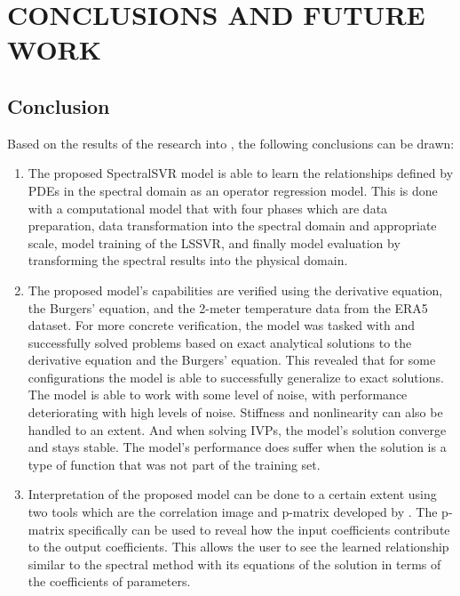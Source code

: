 \chapter{CONCLUSIONS AND FUTURE WORK}\label{sec:conclusions_and_future_work}

\section{Conclusion}
\noindent Based on the results of the research into \MakeLowercase{\judul}, the following conclusions can be drawn:
\begin{enumerate}
    \item The proposed SpectralSVR model is able to learn the relationships defined by PDEs in the spectral domain as an operator regression model. This is done with a computational model that with four phases which are data preparation, data transformation into the spectral domain and appropriate scale, model training of the LSSVR, and finally model evaluation by transforming the spectral results into the physical domain.
    \item The proposed model's capabilities are verified using the derivative equation, the Burgers' equation, and the 2-meter temperature data from the ERA5 dataset. For more concrete verification, the model was tasked with and successfully solved problems based on exact analytical solutions to the derivative equation and the Burgers' equation. This revealed that for some configurations the model is able to successfully generalize to exact solutions. The model is able to work with some level of noise, with performance deteriorating with high levels of noise. Stiffness and nonlinearity can also be handled to an extent. And when solving IVPs, the model's solution converge and stays stable. The model's performance does suffer when the solution is a type of function that was not part of the training set.
    \item Interpretation of the proposed model can be done to a certain extent using two tools which are the correlation image and p-matrix developed by \textcite{ustunVisualisationInterpretationSupport2007}. The p-matrix specifically can be used to reveal how the input coefficients contribute to the output coefficients. This allows the user to see the learned relationship similar to the spectral method with its equations of the solution in terms of the coefficients of parameters.
\end{enumerate}

